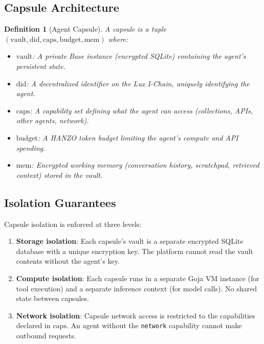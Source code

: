 \documentclass[11pt]{article}
\newtheorem{definition}{Definition}
\begin{document}
\subsection{Capsule Architecture}

\begin{definition}[Agent Capsule]
A capsule is a tuple $(\text{vault}, \text{did}, \text{caps}, \text{budget},
\text{mem})$ where:
\begin{itemize}[leftmargin=1.1em]
    \item $\text{vault}$: A private Base instance (encrypted SQLite) containing
    the agent's persistent state.
    \item $\text{did}$: A decentralized identifier on the Lux I-Chain,
    uniquely identifying the agent.
    \item $\text{caps}$: A capability set defining what the agent can access
    (collections, APIs, other agents, network).
    \item $\text{budget}$: A HANZO token budget limiting the agent's compute
    and API spending.
    \item $\text{mem}$: Encrypted working memory (conversation history,
    scratchpad, retrieved context) stored in the vault.
\end{itemize}
\end{definition}

\subsection{Isolation Guarantees}

Capsule isolation is enforced at three levels:

\begin{enumerate}[leftmargin=1.4em]
    \item \textbf{Storage isolation}: Each capsule's vault is a separate
    encrypted SQLite database with a unique encryption key. The platform
    cannot read the vault contents without the agent's key.
    \item \textbf{Compute isolation}: Each capsule runs in a separate Goja VM
    instance (for tool execution) and a separate inference context (for model
    calls). No shared state between capsules.
    \item \textbf{Network isolation}: Capsule network access is restricted to
    the capabilities declared in $\text{caps}$. An agent without the
    \texttt{network} capability cannot make outbound requests.
\end{enumerate}
\end{document}
